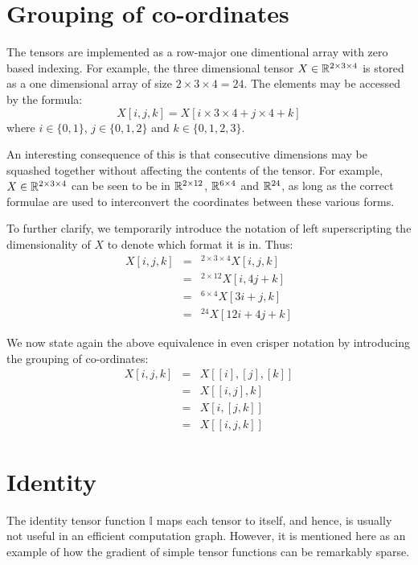\documentclass{article}
\begin{document}
\section{Grouping of co-ordinates}
  The tensors are implemented as a row-major one dimentional array
  with zero based indexing.
  For example, the three dimensional tensor 
  $X \in \mathbb{R}^{2 \times 3 \times 4}$
  is stored as a one dimensional array of size 
  $2 \times 3 \times 4 = 24$.
  The elements may be accessed by the formula:
  \[ X[i, j, k] = X[i \times 3 \times 4 + j \times 4 + k] \]
  where $i \in \{0, 1\}$, 
        $j \in \{0, 1, 2\}$ and 
        $k \in \{0, 1, 2, 3\}$.
    
  An interesting consequence of this 
  is that consecutive dimensions may be squashed together 
  without affecting the contents of the tensor.
  For example, 
  $X \in \mathbb{R}^{2 \times 3 \times 4}$ 
  can be seen to be in
  $\mathbb{R}^{2 \times 12}$,
  $\mathbb{R}^{6 \times 4}$ and $\mathbb{R}^{24}$,
  as long as the correct formulae are used to interconvert
  the coordinates between these various forms.
  
  To further clarify, 
  we temporarily introduce the notation of left superscripting
  the dimensionality of $X$ to denote which format it is in.
  Thus:
  \begin{eqnarray*}
    X[i, j, k] & = & {}^{2 \times 3 \times 4}X[i, j, k]\\ 
               & = & {}^{2 \times 12}X[i, 4j+k] \\
               & = & {}^{6 \times 4}X[3i + j, k] \\
               & = & {}^{24}X[12i + 4j+k]
  \end{eqnarray*}
  
  We now state again the above equivalence
  in even crisper notation by introducing
  the grouping of co-ordinates:
  \begin{eqnarray*}
    X[i, j, k] & = & X[[i], [j], [k]] \\ 
               & = & X[[i, j], k] \\
               & = & X[i, [j, k]] \\
               & = & X[[i, j, k]]
  \end{eqnarray*}
  
\section{Identity}
  The identity tensor function $\mathbb{I}$ maps each tensor to itself,
  and hence, is usually not useful in an efficient computation graph.
  However, it is mentioned here as an example
  of how the gradient of simple tensor functions
  can be remarkably sparse.
  
\end{document}
